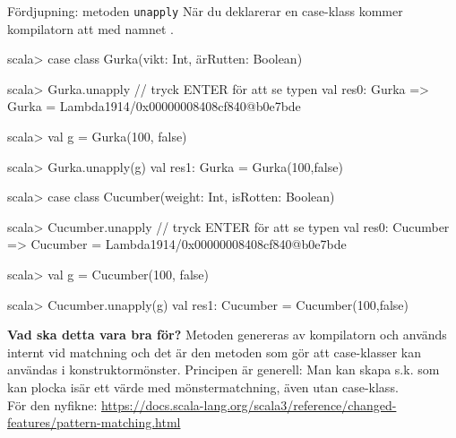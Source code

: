 \begin{Slide}{Fördjupning: metoden \texttt{unapply}}\SlideFontSmall
När du deklarerar en case-klass kommer kompilatorn att  med namnet .
\ifswedish
\begin{REPL}
scala> case class Gurka(vikt: Int, ärRutten: Boolean)

scala> Gurka.unapply // tryck ENTER för att se typen
val res0: Gurka => Gurka = Lambda1914/0x00000008408cf840@b0e7bde

scala> val g = Gurka(100, false)

scala> Gurka.unapply(g)
val res1: Gurka = Gurka(100,false)
\end{REPL}
\else
\begin{REPL}
scala> case class Cucumber(weight: Int, isRotten: Boolean)

scala> Cucumber.unapply // tryck ENTER för att se typen
val res0: Cucumber => Cucumber = Lambda1914/0x00000008408cf840@b0e7bde

scala> val g = Cucumber(100, false)

scala> Cucumber.unapply(g)
val res1: Cucumber = Cucumber(100,false)
\end{REPL}
\fi{}
\textbf{Vad ska detta vara bra för?} \pause 
Metoden  genereras av kompilatorn och används internt vid matchning och det är den metoden som gör att case-klasser kan användas i konstruktormönster. Principen är generell: Man kan skapa  s.k.   som kan plocka isär ett värde med mönstermatchning, även utan case-klass. \\För den nyfikne: \url{https://docs.scala-lang.org/scala3/reference/changed-features/pattern-matching.html} 
\end{Slide}
